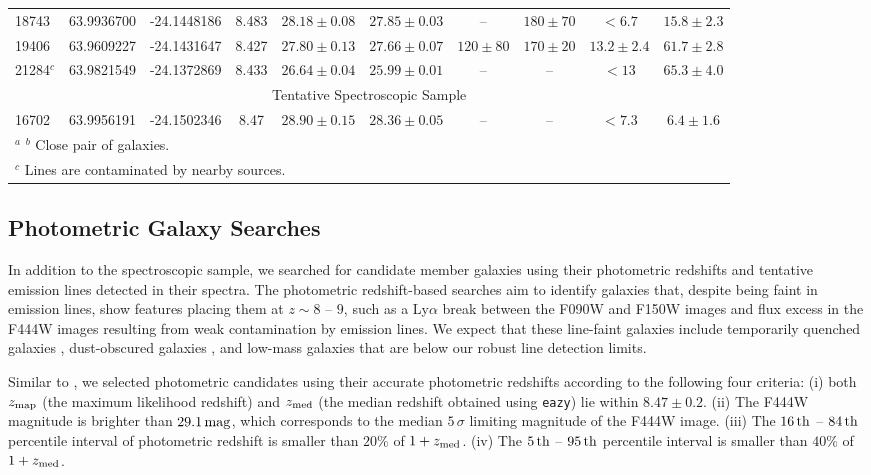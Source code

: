 \documentclass[twocolumn]{aastex631}
\begin{document}
\begin{table}[t]
\begin{tabular}{lccccccccc}
    18743 & 63.9936700 & -24.1448186 & 8.483 & $28.18\pm0.08$& $27.85\pm0.03 $  & -- & $180\pm70 $ & $<6.7$ & $15.8\pm2.3$ \\
    19406 & 63.9609227 & -24.1431647 & 8.427 & $27.80\pm0.13$& $27.66\pm0.07 $  & $120\pm80$ & $170\pm20$ & $13.2\pm2.4$ & $61.7\pm2.8$ \\
    21284$^{c}$ & 63.9821549 & -24.1372869 & 8.433 & $26.64\pm0.04$& $25.99\pm0.01 $  & -- & -- & $<13$ & $65.3\pm4.0$ \\
    \hline
    \multicolumn{10}{c}{Tentative Spectroscopic Sample}\\
    \hline
    16702 & 63.9956191 & -24.1502346 & 8.47 & $28.90\pm0.15$ & $28.36\pm0.05$ & -- & -- & $<7.3$ & $6.4\pm1.6$ \\
    \hline
    \multicolumn{6}{l}{$^{a}$ $^{b}$ Close pair of galaxies.}\\
    \multicolumn{6}{l}{ $^{c}$ Lines are contaminated by nearby sources.}\\
    \end{tabular}
    \label{tab:galaxies}
\end{table}

\subsection{Photometric Galaxy Searches}
\label{sec:photoz}
In addition to the spectroscopic sample, we searched for candidate member galaxies using their photometric redshifts and tentative emission lines detected in their spectra.
The photometric redshift-based searches aim to identify galaxies that, despite being faint  in emission lines, show features placing them at $z\sim8$ -- $9$, such as a Ly$\alpha$ break between the F090W and F150W images and flux excess in the F444W images resulting from weak contamination by emission lines.
We expect that these line-faint galaxies include temporarily quenched galaxies \citep[e.g.,][]{Looser2024,Witten2025}, dust-obscured galaxies \citep[e.g.,][]{Fudamoto2021,Barrufet2023}, and low-mass galaxies that are below our robust line detection limits.

Similar to \citet{Helton2024}, we selected photometric candidates using their accurate photometric redshifts according to the following four criteria: ({\sc i}) both $z_{\rm map}$ (the maximum likelihood redshift) and $z_{\rm med}$ (the median redshift obtained using \texttt{eazy}) lie within $8.47\pm0.2$. ({\sc ii}) The F444W magnitude is brighter than $29.1\,{\rm mag}$, which corresponds to the median $5\,\sigma$ limiting magnitude of the F444W image. ({\sc iii}) The $16\,{\rm th}$ -- $84\,{\rm th}$ percentile interval of photometric redshift is smaller than $20\%$ of $1 + z_{\rm med}$.
({\sc iv}) The $5\,{\rm th}$ -- $95\,{\rm th}$ percentile interval is smaller than $40\%$ of $1 + z_{\rm med}$.
\end{document}
